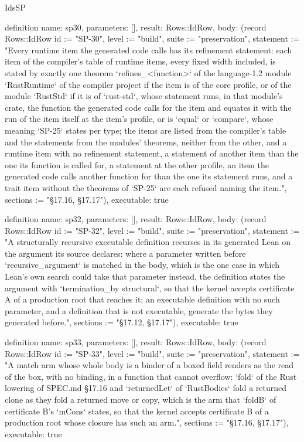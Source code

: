 \begin{lexlean}{IdsSP}
\begin{semanticmodule}
definition{
  name: sp30,
  parameters: [],
  result: Rows::IdRow,
  body: (record Rows::IdRow {id := "SP-30", level := "build", suite := "preservation", statement := "Every runtime item the generated code calls has its refinement statement: each item of the compiler's table of runtime items, every fixed width included, is stated by exactly one theorem `refines_<function>` of the language-1.2 module `RustRuntime` of the compiler project if the item is of the core profile, or of the module `RustStd` if it is of `rust-std`, whose statement runs, in that module's crate, the function the generated code calls for the item and equates it with the run of the item itself at the item's profile, or is `equal` or `compare`, whose meaning `SP-25` states per type; the items are listed from the compiler's table and the statements from the modules' theorems, neither from the other, and a runtime item with no refinement statement, a statement of another item than the one its function is called for, a statement at the other profile, an item the generated code calls another function for than the one its statement runs, and a trait item without the theorems of `SP-25` are each refused naming the item.", sections := "§17.16, §17.17"}),
  executable: true
}

definition{
  name: sp32,
  parameters: [],
  result: Rows::IdRow,
  body: (record Rows::IdRow {id := "SP-32", level := "build", suite := "preservation", statement := "A structurally recursive executable definition recurses in its generated Lean on the argument its source declares: where a parameter written before `recursive_argument` is matched in the body, which is the one case in which Lean's own search could take that parameter instead, the definition states the argument with `termination_by structural`, so that the kernel accepts certificate A of a production root that reaches it; an executable definition with no such parameter, and a definition that is not executable, generate the bytes they generated before.", sections := "§17.12, §17.17"}),
  executable: true
}

definition{
  name: sp33,
  parameters: [],
  result: Rows::IdRow,
  body: (record Rows::IdRow {id := "SP-33", level := "build", suite := "preservation", statement := "A match arm whose whole body is a binder of a boxed field renders as the read of the box, with no binding, in a function that cannot overflow: `fold` of the Rust lowering of SPEC.md §17.16 and `returnedLet` of `RustBodies` fold a returned clone as they fold a returned move or copy, which is the arm that `foldB` of certificate B's `mCons` states, so that the kernel accepts certificate B of a production root whose closure has such an arm.", sections := "§17.16, §17.17"}),
  executable: true
}


\end{semanticmodule}
\end{lexlean}

